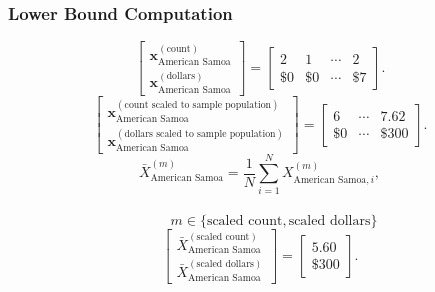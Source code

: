 \subsubsection{Lower Bound Computation}
\[
\begin{bmatrix}
\mathbf{x}_{\text{American Samoa}}^{(\text{count})}\\
\mathbf{x}_{\text{American Samoa}}^{(\text{dollars})}
\end{bmatrix}
=
\begin{bmatrix}
2 & 1 & \cdots & 2\\
\$0 & \$0 & \cdots & \$7
\end{bmatrix}.
\]
\[
\begin{bmatrix}
\mathbf{x}_{\text{American Samoa}}^{(\text{count scaled to sample population})}\\
\mathbf{x}_{\text{American Samoa}}^{(\text{dollars scaled to sample population})}
\end{bmatrix}
=
\begin{bmatrix}
6 & \cdots & 7.62\\
\$0 & \cdots & \$300
\end{bmatrix}.
\]
  \[
\bar{X}_{\text{American Samoa}}^{(m)}
= \frac{1}{N}\sum_{i=1}^{N} X_{\text{American Samoa},i}^{(m)},
\]
\\
\[
\qquad
m \in \{\text{scaled count},\text{scaled dollars}\}
\]
\[
\begin{bmatrix}
\bar{X}_{\text{American Samoa}}^{(\text{scaled count})}\\
\bar{X}_{\text{American Samoa}}^{(\text{scaled dollars})}
\end{bmatrix}
=
\begin{bmatrix}
5.60\\
\$300
\end{bmatrix}.
\]
